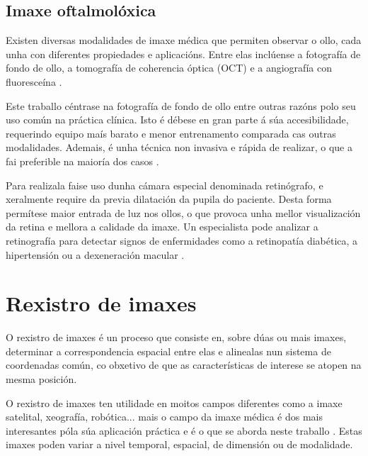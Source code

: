 \subsection{Imaxe oftalmolóxica}
\label{subsec:Imaxe oftalmolóxica}
Existen diversas modalidades de imaxe médica que permiten observar o ollo, cada unha con diferentes propiedades e aplicacións. 
Entre elas inclúense a fotografía de fondo de ollo, a tomografía de coherencia óptica (OCT) e a angiografía con fluoresceína \cite{ilginis2014ophthalmic}.

Este traballo céntrase na fotografía de fondo de ollo entre outras razóns polo seu uso común na práctica clínica.
Isto é débese en gran parte á súa accesibilidade, requerindo equipo maís barato e menor entrenamento comparada cas outras modalidades. 
Ademais, é unha técnica non invasiva e rápida de realizar, o que a fai preferible na maioría dos casos \cite{retinimaging}.

Para realizala faise uso dunha cámara especial denominada retinógrafo, e xeralmente require da previa dilatación da pupila do paciente.
Desta forma permítese maior entrada de luz nos ollos, o que provoca unha mellor visualización da retina e mellora a calidade da imaxe.
Un especialista pode analizar a retinografía para detectar signos de enfermidades como a retinopatía diabética, a hipertensión ou a dexeneración macular \cite{retreggood}.

\section{Rexistro de imaxes}
\label{sec:Rexistro de imaxes}
O rexistro de imaxes é un proceso que consiste en, sobre dúas ou mais imaxes, determinar a correspondencia espacial entre elas
 e alinealas nun sistema de coordenadas común, co obxetivo de que as características de interese se atopen na mesma posición.


O rexistro de imaxes ten utilidade en moitos campos diferentes como a imaxe satelital, xeografía, robótica... mais o 
campo da imaxe médica é dos mais interesantes póla súa aplicación práctica e é o que se aborda neste traballo \cite{goshtasby2017theory}.
Estas imaxes poden variar a nivel temporal, espacial, de dimensión ou de modalidade.

